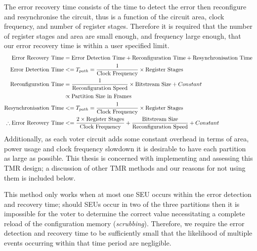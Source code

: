 \documentclass[12pt,final,oneside]{dwThesis} %
\begin{document}
The error recovery time consists of the time to detect the error then reconfigure and resynchronise the circuit, thus is a function of the circuit area, clock frequency, and number of register stages. Therefore it is required that the number of register stages and area are small enough, and frequency large enough, that our error recovery time is within a user specified limit.
\begin{align}
    \mbox{Error Recovery Time} &=\mbox{Error Detection Time} + \mbox{Reconfiguration Time} + \mbox{Resynchronisation Time}\notag\\
    \mbox{Error Detection Time} &<= T_{path} = \frac{1}{\mbox{Clock Frequency}}\times\mbox{Register Stages}\notag\\
    \mbox{Reconfiguration Time} &= \frac{1}{\mbox{Reconfiguration Speed}}\times\mbox{Bitstream Size}+Constant\notag\\
     &\propto \mbox{Partition Size in Frames}\notag\\
    \mbox{Resynchronisation Time} &<= T_{path} = \frac{1}{\mbox{Clock Frequency}}\times\mbox{Register Stages}\notag\\
    \therefore \mbox{Error Recovery Time} &<= \frac{2\times\mbox{Register Stages}}{\mbox{Clock Frequency}} + \frac{\mbox{Bitstream Size}}{\mbox{Reconfiguration Speed}}+Constant\label{ERT}
\end{align}\cite{DiesselChange}
Additionally, as each voter circuit adds some constant overhead in terms of area, power usage and clock frequency slowdown it is desirable to have each partition as large as possible. This thesis is concerned with implementing and assessing this \ac{TMR} design; a discussion of other \ac{TMR} methods and our reasons for not using them is included below.
 
This method only works when at most one \ac{SEU} occurs within the error detection and recovery time; should \acp{SEU} occur in two of the three partitions then it is impossible for the voter to determine the correct value necessitating a complete reload of the configuration memory (\emph{scrubbing}). Therefore, we require the error detection and recovery time to be sufficiently small that the likelihood of multiple events occurring within that time period are negligible.
\end{document}
